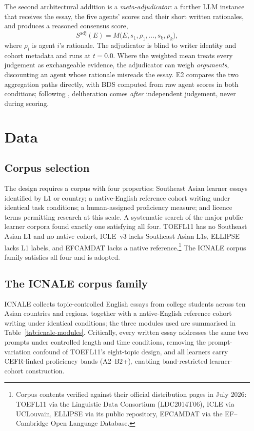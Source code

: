 The second architectural addition is a \emph{meta-adjudicator}: a
further LLM instance that receives the essay, the five agents'
scores and their short written rationales, and produces a reasoned
consensus score,
\begin{equation}
S^{\mathrm{adj}}(E) = M\bigl(E, s_1, \rho_1, \dots, s_k, \rho_k\bigr),
\end{equation}
where $\rho_i$ is agent $i$'s rationale. The adjudicator is blind to
writer identity and cohort metadata and runs at $t = 0.0$. Where the
weighted mean treats every judgement as exchangeable evidence, the
adjudicator can weigh \emph{arguments}, discounting an agent whose
rationale misreads the essay. E2 compares the two aggregation paths
directly, with BDS computed from raw agent scores in both
conditions; following \citet{mirza2025malibu}, deliberation comes
\emph{after} independent judgement, never during scoring.

\section{Data}
\label{sec:data}

\subsection*{Corpus selection}
The design requires a corpus with four properties: Southeast Asian
learner essays identified by L1 or country; a native-English
reference cohort writing under identical task conditions; a
human-assigned proficiency measure; and licence terms permitting
research at this scale. A systematic search of the major public
learner corpora found exactly one satisfying all four. TOEFL11
\citep{blanchard2013toefl11} has no Southeast Asian L1 and no native
cohort, ICLE~v3 lacks Southeast Asian L1s, ELLIPSE lacks L1 labels,
and EFCAMDAT lacks a native reference.\footnote{Corpus contents
verified against their official distribution pages in July 2026:
TOEFL11 via the Linguistic Data Consortium (LDC2014T06), ICLE via
UCLouvain, ELLIPSE via its public repository, EFCAMDAT via the
EF--Cambridge Open Language Database.} The ICNALE corpus family
\citep{ishikawa2023icnale} satisfies all four and is adopted.

\subsection*{The ICNALE corpus family}
ICNALE collects topic-controlled English essays from college students
across ten Asian countries and regions, together with a
native-English reference cohort writing under identical conditions;
the three modules used are summarised in
Table~\ref{tab:icnale-modules}. Critically, every written essay
addresses the same two prompts under controlled length and time
conditions, removing the prompt-variation confound of TOEFL11's
eight-topic design, and all learners carry CEFR-linked proficiency
bands (A2--B2+), enabling band-restricted learner-cohort construction.

